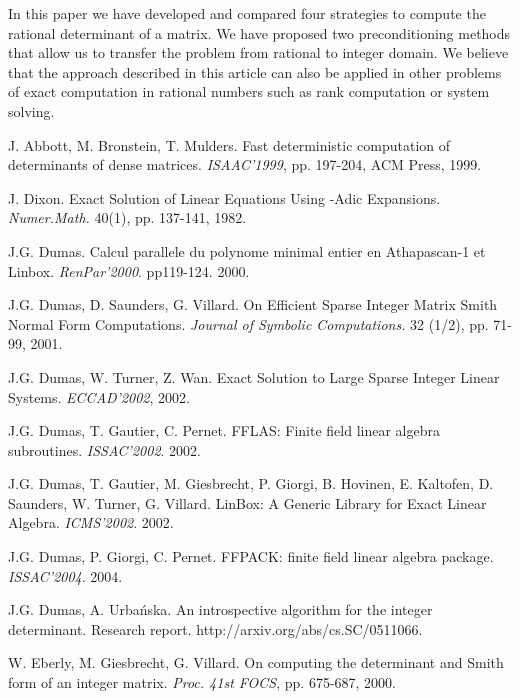 \documentclass{acm_proc_article-sp}   \usepackage{graphicx,url}
\begin{document}
In this paper we have developed and compared four strategies to compute the rational determinant of a matrix. We have proposed two preconditioning methods that allow us to transfer the problem from rational to integer domain. We believe that the approach described in this article can also be applied in other problems of exact computation in rational numbers such as rank computation or system solving. 

\begin{thebibliography}{99}

 J. Abbott, M. Bronstein, T. Mulders. Fast
deterministic computation of determinants of dense matrices. {\em ISAAC'1999}, pp. 197-204, ACM Press, 1999.





 J. Dixon. Exact Solution of Linear Equations Using
-Adic Expansions. {\em Numer.Math.} 40(1), pp. 137-141, 1982.

 J.G. Dumas. Calcul parallele du polynome minimal entier en Athapascan-1 et Linbox. {\em RenPar'2000}. pp119-124.  2000.

 J.G. Dumas, D. Saunders, G. Villard. On Efficient
Sparse Integer Matrix Smith Normal Form Computations. {\em Journal
of Symbolic Computations.} 32 (1/2), pp. 71-99, 2001.

J.G. Dumas, W. Turner, Z. Wan.  Exact Solution to Large Sparse
Integer Linear Systems. {\em ECCAD'2002}, 2002.

J.G. Dumas, T. Gautier, C. Pernet. FFLAS: Finite field linear algebra
subroutines. {\em ISSAC'2002}. 2002.

J.G. Dumas, T. Gautier, M. Giesbrecht, P. Giorgi, B. Hovinen, E. Kaltofen, D. Saunders, W. Turner, G. Villard.
 LinBox: A Generic Library for Exact Linear Algebra. {\em ICMS'2002}. 2002.



J.G. Dumas, P. Giorgi, C. Pernet. FFPACK: finite field linear algebra
package. {\em ISSAC'2004}. 2004.





J.G. Dumas, A. Urba\'nska. An introspective algorithm for the integer determinant.
Research report. http://arxiv.org/abs/cs.SC/0511066.



 W. Eberly, M. Giesbrecht, G. Villard. On computing
the determinant and Smith form of an integer matrix. {\em Proc.
41st FOCS}, pp. 675-687, 2000.


\end{thebibliography}
\end{document}

